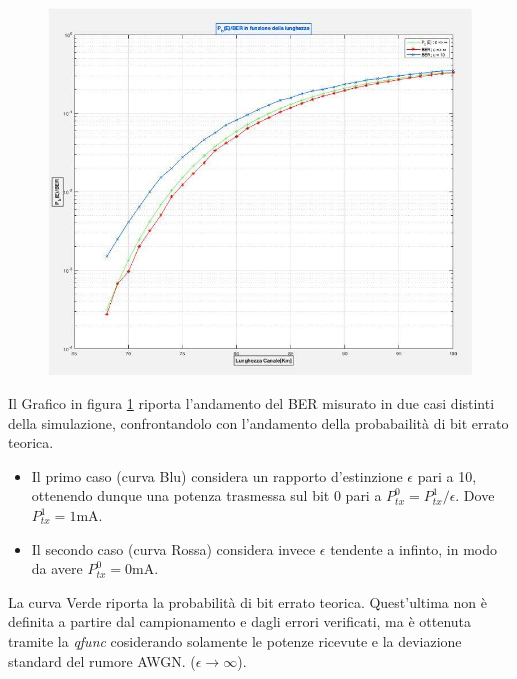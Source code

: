 \documentclass[12pt, a4paper]{article}
\begin{document}
\begin{figure}[h!]
\centering
\includegraphics[scale=0.6]{probbiterrato.jpg}
\caption{}
\label{Pbe}
\end{figure}

Il Grafico in figura \ref{Pbe} riporta l'andamento del BER misurato in due casi distinti della simulazione, confrontandolo con l'andamento della probabailità di bit errato teorica.
\begin{itemize}
	\item Il primo caso (curva Blu) considera un rapporto d'estinzione $\epsilon$ pari a 10, ottenendo dunque una potenza trasmessa sul bit 0 pari a $P_{tx}^0 = P_{tx}^1/\epsilon $. Dove $P_{tx}^1 = 1$mA.
	\item Il secondo caso (curva Rossa) considera invece $\epsilon$ tendente a infinto, in modo da avere $P_{tx}^0 = 0$mA.
\end{itemize}

La curva Verde riporta la probabilità di bit errato teorica. Quest'ultima non è definita a partire dal campionamento e dagli errori verificati, ma è ottenuta tramite la \textit{qfunc} cosiderando solamente le potenze ricevute e la deviazione standard del rumore AWGN.  ($\epsilon \rightarrow \infty$).  


\end{document}
